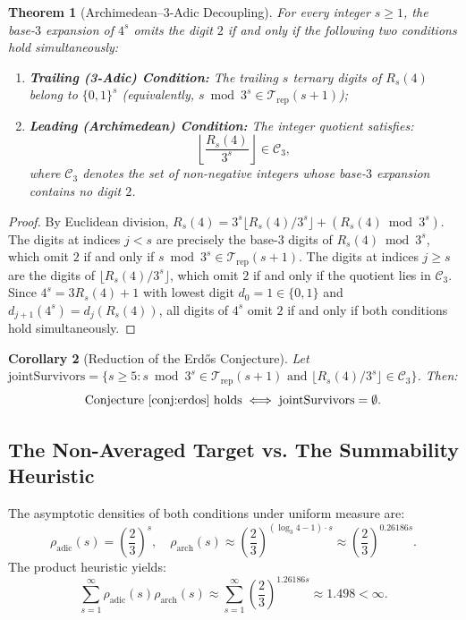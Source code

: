 \documentclass[11pt,reqno]{amsart}
\theoremstyle{plain}
\newtheorem{theorem}{Theorem}[section]
\newtheorem{corollary}[theorem]{Corollary}
\theoremstyle{definition}
\theoremstyle{remark}
\newcommand{\C}{\mathcal{C}}
\newcommand{\Trep}{\mathcal{T}_{\mathrm{rep}}}
\begin{document}
\begin{theorem}[Archimedean--$3$-Adic Decoupling]\label{thm:decoupling}
For every integer $s \ge 1$, the base-$3$ expansion of $4^s$ omits the digit $2$ if and only if the following two conditions hold simultaneously:
\begin{enumerate}
    \item \textbf{Trailing (3-Adic) Condition:} The trailing $s$ ternary digits of $R_s(4)$ belong to $\{0, 1\}^s$ (equivalently, $s \bmod 3^s \in \Trep(s+1)$);
    \item \textbf{Leading (Archimedean) Condition:} The integer quotient satisfies:
    \begin{equation}
    \left\lfloor \frac{R_s(4)}{3^s} \right\rfloor \in \C_3,
    \end{equation}
    where $\C_3$ denotes the set of non-negative integers whose base-$3$ expansion contains no digit $2$.
\end{enumerate}
\end{theorem}

\begin{proof}
By Euclidean division, $R_s(4) = 3^s \lfloor R_s(4)/3^s \rfloor + (R_s(4) \bmod 3^s)$. The digits at indices $j < s$ are precisely the base-$3$ digits of $R_s(4) \bmod 3^s$, which omit $2$ if and only if $s \bmod 3^s \in \Trep(s+1)$. The digits at indices $j \ge s$ are the digits of $\lfloor R_s(4)/3^s \rfloor$, which omit $2$ if and only if the quotient lies in $\C_3$. Since $4^s = 3 R_s(4) + 1$ with lowest digit $d_0 = 1 \in \{0, 1\}$ and $d_{j+1}(4^s) = d_j(R_s(4))$, all digits of $4^s$ omit $2$ if and only if both conditions hold simultaneously.
\end{proof}

\begin{corollary}[Reduction of the Erd\H{o}s Conjecture]\label{cor:reduction}
Let $\mathrm{jointSurvivors} = \{ s \ge 5 : s \bmod 3^s \in \Trep(s+1) \text{ and } \lfloor R_s(4)/3^s \rfloor \in \C_3 \}$. Then:
\begin{equation}
\text{Conjecture~\ref{conj:erdos} holds} \iff \mathrm{jointSurvivors} = \emptyset.
\end{equation}
\end{corollary}

\subsection{The Non-Averaged Target vs. The Summability Heuristic}
The asymptotic densities of both conditions under uniform measure are:
\begin{equation}
\rho_{\mathrm{adic}}(s) = \left(\frac{2}{3}\right)^s, \quad \rho_{\mathrm{arch}}(s) \approx \left(\frac{2}{3}\right)^{(\log_3 4 - 1) \cdot s} \approx \left(\frac{2}{3}\right)^{0.26186 s}.
\end{equation}
The product heuristic yields:
\begin{equation}
\sum_{s=1}^\infty \rho_{\mathrm{adic}}(s) \rho_{\mathrm{arch}}(s) \approx \sum_{s=1}^\infty \left(\frac{2}{3}\right)^{1.26186 s} \approx 1.498 < \infty.
\end{equation}
\end{document}
